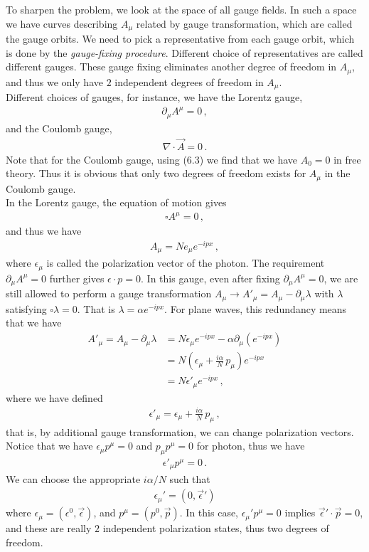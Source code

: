 \documentclass[11pt, onesided]{book}
\theoremstyle{break}
\theoremstyle{break}
\newcommand{\pd}{\partial}
\begin{document}
To sharpen the problem, we look at the space of all gauge fields. In such a space we have curves describing $A_\mu$ related by gauge transformation, which are called the gauge orbits. We need to pick a representative from each gauge orbit, which is done by the \textit{gauge-fixing procedure}. Different choice of representatives are called different gauges. These gauge fixing eliminates another degree of freedom in $A_\mu$, and thus we only have $2$ independent degrees of freedom in $A_\mu$. \\

Different choices of gauges, for instance, we have the Lorentz gauge,
\begin{align*}
\pd_\mu A^\mu = 0\,,
\end{align*}
and the Coulomb gauge,
\begin{align*}
\nabla \cdot \vec{A} = 0\,.
\end{align*}
Note that for the Coulomb gauge, using (6.3) we find that we have $A_0 = 0$ in free theory. Thus it is obvious that only two degrees of freedom exists for $A_\mu$ in the Coulomb gauge.\\

In the Lorentz gauge, the equation of motion gives
\begin{align*}
\square A^\mu = 0\,,
\end{align*}
and thus we have
\begin{align*}
A_\mu = N e_\mu e^{-ipx}\,,
\end{align*}
where $\epsilon_\mu$ is called the polarization vector of the photon. The requirement $\pd_\mu A^\mu = 0$ further gives $\epsilon \cdot p = 0$. In this gauge, even after fixing $\pd_\mu A^\mu = 0$, we are still allowed to perform a gauge transformation $A_\mu \to A'_\mu = A_\mu -\pd_\mu \lambda$ with $\lambda$ satisfying $\square \lambda = 0$. That is $\lambda =\alpha e^{-ipx}$. For plane waves, this redundancy means that we have
\begin{align*}
A'_\mu = A_\mu - \pd_\mu \lambda 
&= N \epsilon_\mu e^{-ipx} - \alpha \pd_\mu (e^{-ipx})\\
&=N \left( \epsilon_\mu + \frac{i\alpha}{N}\, p_\mu\right) e^{-ipx}\\
&= N \epsilon'_\mu e^{-ipx}\,,
\end{align*}
where we have defined
\begin{align*}
\epsilon'_\mu = \epsilon_\mu + \frac{i\alpha}{N}\, p_\mu\,,
\end{align*}
that is, by additional gauge transformation, we can change polarization vectors. Notice that we have $\epsilon_\mu p^\mu = 0$ and $p_\mu p^\mu = 0$ for photon, thus we have
\begin{align*}
\epsilon'_\mu p^\mu = 0\,.
\end{align*}
We can choose the appropriate $i\alpha /N$ such that 
\begin{align*}
\epsilon_\mu' = (0 , \vec{\epsilon}')
\end{align*}
where $\epsilon_\mu = (\epsilon^0, \vec{\epsilon})$, and $p^\mu = (p^0, \vec{p})$. In this case, $\epsilon_\mu' p^\mu = 0$ implies $\vec{\epsilon}'\cdot \vec{p} = 0$, and these are really $2$ independent polarization states, thus two degrees of freedom. 
\end{document}
